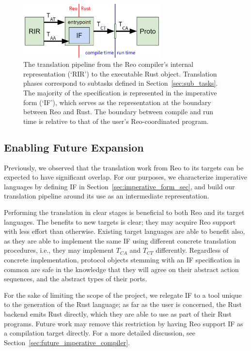 \begin{figure}
	\centering
	\includegraphics[width=0.67\textwidth]{pipeline.png}
	\caption[Reo to Rust code generation pipeline.]{The translation pipeline from the Reo compiler's internal representation (`RIR') to the executable Rust  object. Translation phases correspond to subtasks defined in Section~\ref{sec:sub_tasks}. The majority of the specification is represented in the imperative form (`IF'), which serves as the representation at the boundary between Reo and Rust. The boundary between compile and run time is relative to that of the user's Reo-coordinated program.}
	\label{fig:pipeline}
\end{figure}

\subsection{Enabling Future Expansion}
Previously, we observed that the translation work from Reo to its targets can be expected to have significant overlap. For our purposes, we characterize imperative languages by defining IF in Section~\ref{sec:imperative_form_sec}, and build our translation pipeline around its use as an intermediate representation.

Performing the translation in clear stages is beneficial to both Reo and its target languages. The benefits to new targets is clear; they may acquire Reo support with less effort than otherwise. Existing target languages are able to benefit also, as they are able to implement the same IF using different concrete translation procedures, i.e., they may implement $T_{CA}$ and $T_{CT}$ differently. Regardless of concrete implementation, protocol objects stemming with an IF specification in common are safe in the knowledge that they will agree on their abstract action sequences, and the abstract types of their ports.

For the sake of limiting the scope of the project, we relegate IF to a tool unique to the generation of the Rust language; as far as the user is concerned, the Rust backend emits Rust directly, which they are able to use as part of their Rust programs. Future work may remove this restriction by having Reo support IF as a compilation target directly. For a more detailed discussion, see Section~\ref{sec:future_imperative_compiler}.


